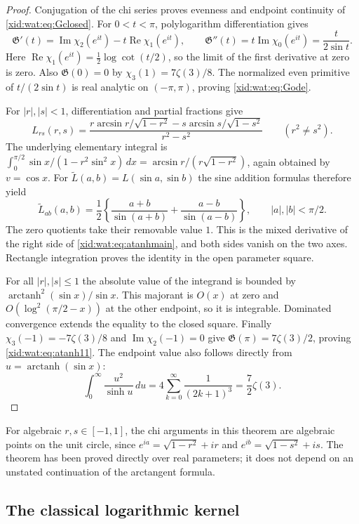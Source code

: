 \begin{proof}
Conjugation of the chi series proves evenness and endpoint
continuity of \eqref{xid:wat:eq:Gclosed}. For $0<t<\pi$,
polylogarithm differentiation gives
\[
 \mathfrak G'(t)=\operatorname{Im}\chi_2(e^{it})
                    -t\operatorname{Re}\chi_1(e^{it}),
 \qquad
 \mathfrak G''(t)=t\operatorname{Im}\chi_0(e^{it})
                 =\frac{t}{2\sin t}.
\]
Here $\operatorname{Re}\chi_1(e^{it})=\tfrac12\log\cot(t/2)$,
so the limit of the first derivative at zero is zero. Also
$\mathfrak G(0)=0$ by $\chi_3(1)=7\zeta(3)/8$.
The normalized even primitive of $t/(2\sin t)$ is real analytic
on $(-\pi,\pi)$, proving \eqref{xid:wat:eq:Gode}.

For $|r|,|s|<1$, differentiation and partial fractions give
\[
 L_{rs}(r,s)=
 \frac{r\arcsin r/\sqrt{1-r^2}
       -s\arcsin s/\sqrt{1-s^2}}{r^2-s^2}
 \qquad(r^2\ne s^2).
\]
The underlying elementary integral is
$\int_0^{\pi/2}\sin x/(1-r^2\sin^2x)\,dx
 =\arcsin r/(r\sqrt{1-r^2})$, again obtained by $v=\cos x$.
For $\widetilde L(a,b)=L(\sin a,\sin b)$ the sine addition formulas
therefore yield
\[
 \widetilde L_{ab}(a,b)
   =\frac12\left\{
       \frac{a+b}{\sin(a+b)}+\frac{a-b}{\sin(a-b)}\right\},
 \qquad |a|,|b|<\pi/2.
\]
The zero quotients take their removable value $1$. This is the
mixed derivative of the right side of \eqref{xid:wat:eq:atanhmain},
and both sides vanish on the two axes. Rectangle integration proves
the identity in the open parameter square.

For all $|r|,|s|\leq1$ the absolute value of the integrand is bounded
by $\operatorname{arctanh}^2(\sin x)/\sin x$. This majorant is
$O(x)$ at zero and $O(\log^2(\pi/2-x))$ at the other endpoint,
so it is integrable. Dominated convergence extends the equality
to the closed square. Finally
$\chi_3(-1)=-7\zeta(3)/8$ and
$\operatorname{Im}\chi_2(-1)=0$ give
$\mathfrak G(\pi)=7\zeta(3)/2$, proving
\eqref{xid:wat:eq:atanh11}.
The endpoint value also follows directly from
$u=\operatorname{arctanh}(\sin x)$:
\[
 \int_0^\infty\frac{u^2}{\sinh u}\,du
    =4\sum_{k=0}^\infty\frac1{(2k+1)^3}
    =\frac72\zeta(3).
\]
\end{proof}

For algebraic $r,s\in[-1,1]$, the chi arguments in this theorem are
algebraic points on the unit circle, since
$e^{ia}=\sqrt{1-r^2}+ir$ and
$e^{ib}=\sqrt{1-s^2}+is$. The theorem has been proved directly over
real parameters; it does not depend on an unstated continuation of
the arctangent formula.

\subsection{The classical logarithmic kernel}

